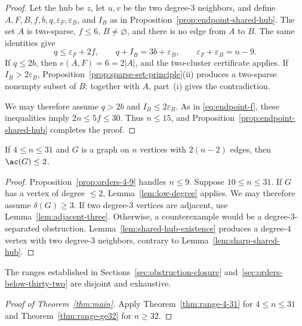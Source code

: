 \begin{proof}
Let the hub be \(z\), let \(u,v\) be the two degree-\(3\) neighbors,
and define \(A,F,B,f,b,q,\varepsilon_F,\varepsilon_B\), and \(I_B\) as in
Proposition~\ref{prop:endpoint-shared-hub}.  The set \(A\) is
two-sparse, \(f\le6\), \(B\ne\varnothing\), and there is no edge from
\(A\) to \(B\).  The same identities give
\[
 q\le \varepsilon_F+2f,\qquad q+I_B=3b+\varepsilon_B,\qquad
 \varepsilon_F+\varepsilon_B=n-9.
\]
If \(q\le2b\), then \(e(A,F)=6=2|A|\), and the two-cluster
certificate applies.  If \(I_B>2\varepsilon_B\),
Proposition~\ref{prop:sparse-set-principle}(ii) produces a two-sparse
nonempty subset of \(B\); together with \(A\), part~(i) gives the
contradiction.

We may therefore assume \(q>2b\) and \(I_B\le2\varepsilon_B\).
As in \eqref{eq:endpoint-f}, these inequalities imply
\(2n\le5f\le30\).  Thus \(n\le15\), and
Proposition~\ref{prop:endpoint-shared-hub} completes the proof.
\end{proof}

\begin{theorem}\label{thm:range-4-31}
If \(4\le n\le31\) and \(G\) is a graph on \(n\) vertices with
\(2(n-2)\) edges, then \(\ac(G)\le2\).
\end{theorem}

\begin{proof}
Proposition~\ref{prop:orders-4-9} handles \(n\le9\).  Suppose
\(10\le n\le31\).  If \(G\) has a vertex of degree \(\le2\),
Lemma~\ref{lem:low-degree} applies.  We may therefore assume
\(\delta(G)\ge3\).  If two degree-\(3\) vertices are adjacent, use
Lemma~\ref{lem:adjacent-three}.  Otherwise, a counterexample would be a
degree-\(3\)-separated obstruction.  Lemma~\ref{lem:shared-hub-existence}
produces a degree-\(4\) vertex with two degree-\(3\) neighbors, contrary to
Lemma~\ref{lem:sharp-shared-hub}.
\end{proof}

The ranges established in Sections~\ref{sec:obstruction-closure}
and~\ref{sec:orders-below-thirty-two} are disjoint and exhaustive.

\begin{proof}[Proof of Theorem~\ref{thm:main}]
Apply Theorem~\ref{thm:range-4-31} for \(4\le n\le31\) and
Theorem~\ref{thm:range-ge32} for \(n\ge32\).
\end{proof}
